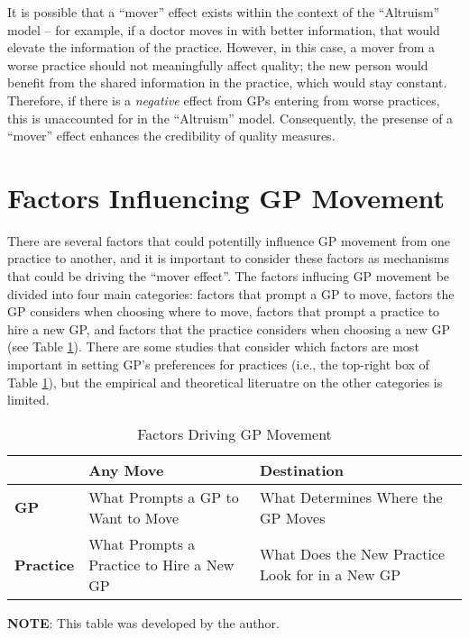 \documentclass[12pt]{article}
\begin{document}
It is possible that a ``mover'' effect exists within the context of the ``Altruism'' model -- for example, if a doctor moves in with better information, that would elevate the information of the practice. However, in this case, a mover from a worse practice should not meaningfully affect quality; the new person would benefit from the shared information in the practice, which would stay constant. Therefore, if there is a \emph{negative} effect from GPs entering from worse practices, this is unaccounted for in the ``Altruism'' model. Consequently, the presense of a ``mover'' effect enhances the credibility of quality measures.



\section{Factors Influencing GP Movement}

There are several factors that could potentilly influence GP movement from one practice to another, and it is important to consider these factors as mechanisms that could be driving the ``mover effect''. The factors influcing GP movement be divided into four main categories: factors that prompt a GP to move, factors the GP considers when choosing where to move, factors that prompt a practice to hire a new GP, and factors that the practice considers when choosing a new GP (see Table \ref{tab:Factors}). There are some studies that consider which factors are most important in setting GP's preferences for practices (i.e., the top-right box of Table \ref{tab:Factors}), but the empirical and theoretical literuatre on the other categories is limited.

\begin{table}
  \caption{Factors Driving GP Movement}
  \begin{center}
      \begin{threeparttable}
      \begin{tabular}{|p{3cm}|p{5cm}|p{5cm}|}
        \hline
         & \textbf{Any Move} & \textbf{Destination} \\ \hline
        \textbf{GP} & What Prompts a GP to Want to Move & What Determines Where the GP Moves \\ \hline
        \textbf{Practice} & What Prompts a Practice to Hire a New GP & What Does the New Practice Look for in a New GP \\ \hline
      \end{tabular}
      \begin{tablenotes}
        \footnotesize
        \textbf{NOTE}: This table was developed by the author.
      \end{tablenotes}
    \end{threeparttable}
  \end{center}
\label{tab:Factors}
\end{table}
\end{document}
